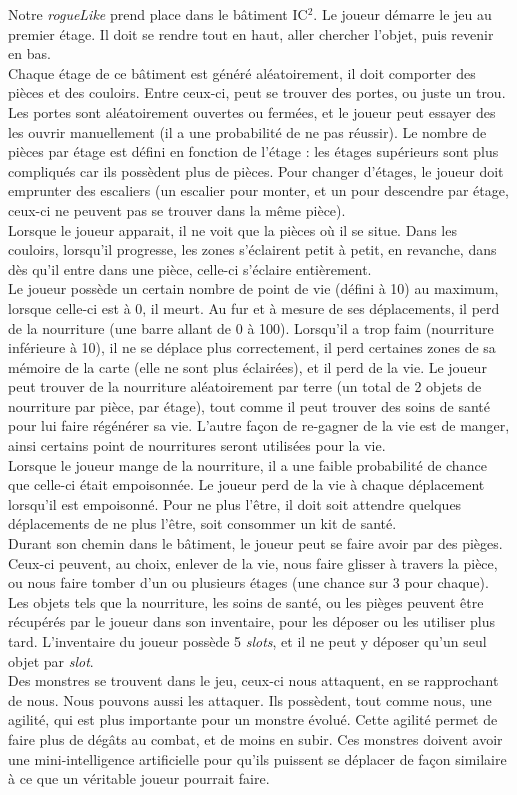 \documentclass[12pt]{report}
\begin{document}
	Notre \emph{rogueLike} prend place dans le bâtiment IC$^2$. Le joueur démarre le jeu au premier étage. Il doit se rendre tout en haut, aller chercher l'objet, puis revenir en bas.\\
	Chaque étage de ce bâtiment est généré aléatoirement, il doit comporter des pièces et des couloirs. Entre ceux-ci, peut se trouver des portes, ou juste un trou. Les portes sont aléatoirement ouvertes ou fermées, et le joueur peut essayer des les ouvrir manuellement (il a une probabilité de ne pas réussir). Le nombre de pièces par étage est défini en fonction de l'étage : les étages supérieurs sont plus compliqués car ils possèdent plus de pièces. Pour changer d'étages, le joueur doit emprunter des escaliers (un escalier pour monter, et un pour descendre par étage, ceux-ci ne peuvent pas se trouver dans la même pièce).\\
	Lorsque le joueur apparait, il ne voit que la pièces où il se situe. Dans les couloirs, lorsqu'il progresse, les zones s'éclairent petit à petit, en revanche, dans dès qu'il entre dans une pièce, celle-ci s'éclaire entièrement.\\
	Le joueur possède un certain nombre de point de vie (défini à 10) au maximum, lorsque celle-ci est à 0, il meurt. Au fur et à mesure de ses déplacements, il perd de la nourriture (une barre allant de 0 à 100). Lorsqu'il a trop faim (nourriture inférieure à 10), il ne se déplace plus correctement, il perd certaines zones de sa mémoire de la carte (elle ne sont plus éclairées), et il perd de la vie. Le joueur peut trouver de la nourriture aléatoirement par terre (un total de 2 objets de nourriture par pièce, par étage), tout comme il peut trouver des soins de santé pour lui faire régénérer sa vie. L'autre façon de re-gagner de la vie est de manger, ainsi certains point de nourritures seront utilisées pour la vie.\\
	Lorsque le joueur mange de la nourriture, il a une faible probabilité de chance que celle-ci était empoisonnée. Le joueur perd de la vie à chaque déplacement lorsqu'il est empoisonné. Pour ne plus l'être, il doit soit attendre quelques déplacements de ne plus l'être, soit consommer un kit de santé.\\
	Durant son chemin dans le bâtiment, le joueur peut se faire avoir par des pièges. Ceux-ci peuvent, au choix, enlever de la vie, nous faire glisser à travers la pièce, ou nous faire tomber d'un ou plusieurs étages (une chance sur 3 pour chaque).\\
	Les objets tels que la nourriture, les soins de santé, ou les pièges peuvent être récupérés par le joueur dans son inventaire, pour les déposer ou les utiliser plus tard. L'inventaire du joueur possède 5 \emph{slots}, et il ne peut y déposer qu'un seul objet par \emph{slot}.\\
	Des monstres se trouvent dans le jeu, ceux-ci nous attaquent, en se rapprochant de nous. Nous pouvons aussi les attaquer. Ils possèdent, tout comme nous, une agilité, qui est plus importante pour un monstre évolué. Cette agilité permet de faire plus de dégâts au combat, et de moins en subir. Ces monstres doivent avoir une mini-intelligence artificielle pour qu'ils puissent se déplacer de façon similaire à ce que un véritable joueur pourrait faire.
	
\end{document}
